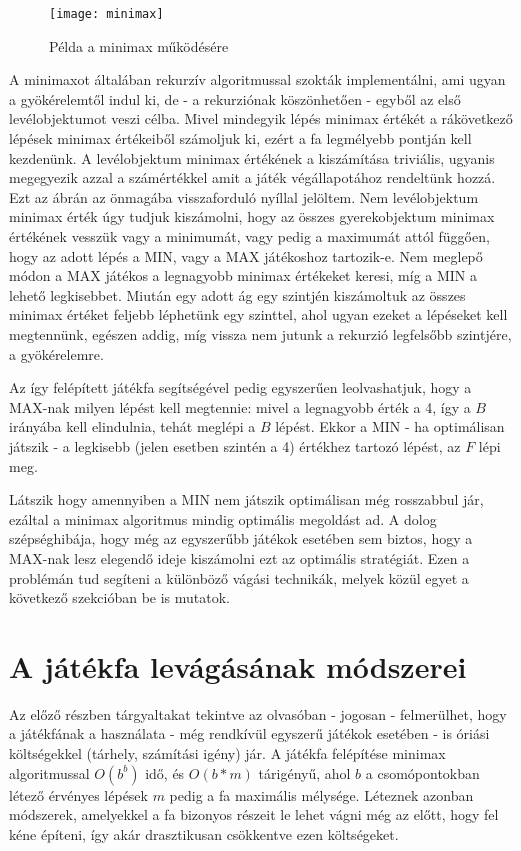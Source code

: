 \begin{figure}[h]
	\texttt{[image: minimax]}
	\centering
	\caption{Példa a minimax működésére}
	\label{fig:minimax}
\end{figure}

A minimaxot általában rekurzív algoritmussal szokták implementálni, ami ugyan a gyökérelemtől indul ki, de - a rekurziónak köszönhetően - egyből az első levélobjektumot veszi célba. Mivel mindegyik lépés minimax értékét a rákövetkező lépések minimax értékeiből számoljuk ki, ezért a fa legmélyebb pontján kell kezdenünk. A levélobjektum minimax értékének a kiszámítása triviális, ugyanis megegyezik azzal a számértékkel amit a játék végállapotához rendeltünk hozzá. Ezt az ábrán az önmagába visszaforduló nyíllal jelöltem. Nem levélobjektum minimax érték úgy tudjuk kiszámolni, hogy az összes gyerekobjektum minimax értékének vesszük vagy a minimumát, vagy pedig a maximumát attól függően, hogy az adott lépés a MIN, vagy a MAX játékoshoz tartozik-e. Nem meglepő módon a MAX játékos a legnagyobb minimax értékeket keresi, míg a MIN a lehető legkisebbet. Miután egy adott ág egy szintjén kiszámoltuk az összes minimax értéket feljebb léphetünk egy szinttel, ahol ugyan ezeket a lépéseket kell megtennünk, egészen addig, míg vissza nem jutunk a rekurzió legfelsőbb szintjére, a gyökérelemre.\ujsor

Az így felépített játékfa segítségével pedig egyszerűen leolvashatjuk, hogy a MAX-nak milyen lépést kell megtennie: mivel a legnagyobb érték a 4, így a $B$ irányába kell elindulnia, tehát meglépi a $B$ lépést. Ekkor a MIN - ha optimálisan játszik - a legkisebb (jelen esetben szintén a 4) értékhez tartozó lépést, az $F$ lépi meg.\ujsor

Látszik hogy amennyiben a MIN nem játszik optimálisan még rosszabbul jár, ezáltal a minimax algoritmus mindig optimális megoldást ad. A dolog szépséghibája, hogy még az egyszerűbb játékok esetében sem biztos, hogy a MAX-nak lesz elegendő ideje kiszámolni ezt az optimális stratégiát. Ezen a problémán tud segíteni a különböző vágási technikák, melyek közül egyet a következő szekcióban be is mutatok.


\section{A játékfa levágásának módszerei}
Az előző részben tárgyaltakat tekintve az olvasóban - jogosan - felmerülhet, hogy a játékfának a használata - még rendkívül egyszerű játékok esetében - is óriási költségekkel (tárhely, számítási igény) jár. A játékfa felépítése minimax algoritmussal $O(b^b)$ idő, és $O(b*m)$ tárigényű, ahol $b$ a csomópontokban létező érvényes lépések $m$ pedig a fa maximális mélysége. Léteznek azonban módszerek, amelyekkel a fa bizonyos részeit le lehet vágni még az előtt, hogy fel kéne építeni, így akár drasztikusan csökkentve ezen költségeket.

